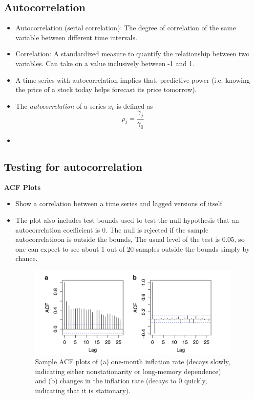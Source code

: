 \documentclass[11pt]{article}
\begin{document}
\subsection{Autocorrelation}
\begin{itemize}
    \item Autocorrelation (serial correlation): The degree of correlation of the same variable 
    between different time intervals.
    \item Correlation: A standardized measure to quantify the relationship between two 
    variables. Can take on a value inclusively between -1 and 1.
    \item A time series with autocorrelation implies that, predictive power (i.e. knowing the
    price of a stock today helps forecast its price tomorrow).
    \item The \textit{autocorrelation} of a series $x_t$ is defined as 
    \[\rho_j = \frac{\gamma_j}{\gamma_0}\]
    \item 
\end{itemize}

\subsection{Testing for autocorrelation}
\textbf{ACF Plots}
\begin{itemize}
    \item Show a correlation between a time series and lagged versions of itself. 
    \item The plot also includes test bounds used to test the null hypothesis that an 
    autocorrelation coefficient is 0. The null is rejected if the sample autocorrelatioon is
    outside the bounds, The usual level of the test is 0.05, so one can expect to see about 1
    out of 20 samples outside the bounds simply by chance. 

    \begin{figure}[H] 
        \centering 
        \includegraphics[width=5in]{imgs/acf_plots.png}
        \caption{Sample ACF plots of (a) one-month inflation rate (decays slowly, indicating 
        either nonstationarity or long-memory dependence) and (b) changes in the inflation rate
        (decays to 0 quickly, indicating that it is stationary).}
    \end{figure}

\end{itemize}
\end{document}
